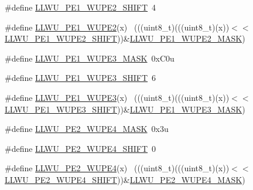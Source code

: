 \begin{DoxyCompactItemize}
\item 
\#define \hyperlink{group___l_l_w_u___register___masks_ga0b1bb86eb31a82a18ad1491b0305000b}{L\+L\+W\+U\+\_\+\+P\+E1\+\_\+\+W\+U\+P\+E2\+\_\+\+S\+H\+I\+FT}~4
\item 
\#define \hyperlink{group___l_l_w_u___register___masks_gaf0bb98cad9b61c52ec222ab4443f6999}{L\+L\+W\+U\+\_\+\+P\+E1\+\_\+\+W\+U\+P\+E2}(x)                                            ~(((uint8\+\_\+t)(((uint8\+\_\+t)(x))$<$$<$\hyperlink{group___l_l_w_u___register___masks_ga0b1bb86eb31a82a18ad1491b0305000b}{L\+L\+W\+U\+\_\+\+P\+E1\+\_\+\+W\+U\+P\+E2\+\_\+\+S\+H\+I\+FT}))\&\hyperlink{group___l_l_w_u___register___masks_ga97e8e2fc8ce673f6b4625d307bc94b4a}{L\+L\+W\+U\+\_\+\+P\+E1\+\_\+\+W\+U\+P\+E2\+\_\+\+M\+A\+SK})
\item 
\#define \hyperlink{group___l_l_w_u___register___masks_ga44cae929b3178e210eb5e1346a4ce997}{L\+L\+W\+U\+\_\+\+P\+E1\+\_\+\+W\+U\+P\+E3\+\_\+\+M\+A\+SK}~0x\+C0u
\item 
\#define \hyperlink{group___l_l_w_u___register___masks_gaceee1b1b6323ba4d33abf875718e885a}{L\+L\+W\+U\+\_\+\+P\+E1\+\_\+\+W\+U\+P\+E3\+\_\+\+S\+H\+I\+FT}~6
\item 
\#define \hyperlink{group___l_l_w_u___register___masks_gaa17ad889c6732bb2f6352d4e5877058c}{L\+L\+W\+U\+\_\+\+P\+E1\+\_\+\+W\+U\+P\+E3}(x)                                            ~(((uint8\+\_\+t)(((uint8\+\_\+t)(x))$<$$<$\hyperlink{group___l_l_w_u___register___masks_gaceee1b1b6323ba4d33abf875718e885a}{L\+L\+W\+U\+\_\+\+P\+E1\+\_\+\+W\+U\+P\+E3\+\_\+\+S\+H\+I\+FT}))\&\hyperlink{group___l_l_w_u___register___masks_ga44cae929b3178e210eb5e1346a4ce997}{L\+L\+W\+U\+\_\+\+P\+E1\+\_\+\+W\+U\+P\+E3\+\_\+\+M\+A\+SK})
\item 
\#define \hyperlink{group___l_l_w_u___register___masks_ga94128d26c60f13d22acf47200f4f37e0}{L\+L\+W\+U\+\_\+\+P\+E2\+\_\+\+W\+U\+P\+E4\+\_\+\+M\+A\+SK}~0x3u
\item 
\#define \hyperlink{group___l_l_w_u___register___masks_ga12aa6ffb998e5273a8dd548ac434ad41}{L\+L\+W\+U\+\_\+\+P\+E2\+\_\+\+W\+U\+P\+E4\+\_\+\+S\+H\+I\+FT}~0
\item 
\#define \hyperlink{group___l_l_w_u___register___masks_ga66bcf97ee2fda285ac3a24ba5cc0b1a1}{L\+L\+W\+U\+\_\+\+P\+E2\+\_\+\+W\+U\+P\+E4}(x)                                            ~(((uint8\+\_\+t)(((uint8\+\_\+t)(x))$<$$<$\hyperlink{group___l_l_w_u___register___masks_ga12aa6ffb998e5273a8dd548ac434ad41}{L\+L\+W\+U\+\_\+\+P\+E2\+\_\+\+W\+U\+P\+E4\+\_\+\+S\+H\+I\+FT}))\&\hyperlink{group___l_l_w_u___register___masks_ga94128d26c60f13d22acf47200f4f37e0}{L\+L\+W\+U\+\_\+\+P\+E2\+\_\+\+W\+U\+P\+E4\+\_\+\+M\+A\+SK})
$$
\end{DoxyCompactItemize}
